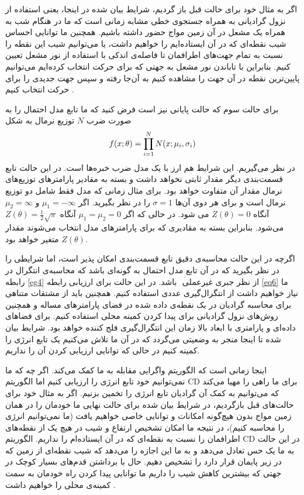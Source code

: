 اگر به مثال خود برای حالت قبل باز گردیم، شرایط بیان شده در اینجا، یعنی‌ استفاده از نزول گرادیانی به همراه جستجوی خطی‌ مشابه زمانی‌ است که ما در هنگام شب به همراه یک مشعل در آن زمین مواج حضور داشته باشیم. همچنین ما توانایی احساس شیب نقطه‌ای که در آن ایستاده‌ایم را خواهیم داشت، یا می‌‌توانیم شیب این نقطه را نسبت به تمام جهت‌های اطرافمان تا فاصله‌ی اندکی‌ با استفاده از نور مشعل تعیین کنیم. بنابراین با تاباندن نور مشعل به جهتی‌ که برای حرکت انتخاب کرده‌ایم می‌‌توانیم پایین‌ترین نقطه در آن جهت را مشاهده کنیم به آن‌جا رفته و سپس جهت جدیدی را برای حرکت انتخاب کنیم
 \cite{woodfordnotes}.

 
 
 برای حالت سوم که حالت پایانی نیز است فرض کنید که ما تابع مدل احتمال را به صورت ضرب
 $N$
 توزیع نرمال به شکل
 \begin{align}
 	\centering
 	f(x;\theta)=\prod_{i=1}^N N(x;\mu_i,\sigma_i)
 	\label{eq8}
 \end{align}
 در نظر می‌‌گیریم.
این شرایط هم ارز با یک مدل ضرب خبره‌ها است. در این حالت تابع قسمت‌بندی دیگر مقدار ثابتی نخواهد داشت و بسته به مقادیر پارامتر‌های توزیع‌های نرمال مقدار آن متفاوت خواهد بود. برای مثال زمانی‌ که مدل فقط شامل دو توزیع نرمال است و برای هر دوی آن‌ها
 $\sigma = 1$
 را در نظر بگیرید. اگر
 $\mu_1 = -\infty$
 و
 $\mu_2 = \infty$
 آنگاه
 $Z(\theta) = 0$
 می‌ شود. در حالی‌ که اگر
 $\mu_1 = \mu_2 = 0$
 آنگاه
 $Z(\theta) = \frac{1}{2}\sqrt{\pi}$
 می‌شود. بنابراین بسته به مقادیری که برای پارامتر‌های مدل انتخاب می‌‌شوند مقدار
 $Z(\theta)$
 متغیر خواهد بود.
 
 اگرچه در این حالت محاسبه‌‌ی دقیق تابع قسمت‌بندی امکان پذیر است، اما شرایطی را در نظر بگیرید که در آن تابع مدل احتمال به گونه‌ای باشد که محاسبه‌ی‌ انتگرال در رابطه
\ref{eg4}
 از نظر جبری غیرعملی
 ‌ باشد. در این حالت برای ارزیابی رابطه
\ref{eq6}
 ما نیاز خواهیم داشت از انتگرال‌گیری عددی
 استفاده کنیم. همچنین باید از مشتقات متناهی برای محاسبه گرادیان در یک نقطه‌ی داده شده در فضای پارامتر‌های مساله و همچنین روش‌های نزول گرادیانی برای پیدا کردن کمینه محلی استفاده کنیم. برای فضاهای داده‌ای و پارامتری با ابعاد بالا زمان این انتگرال‌گیری فلج کننده
 خواهد بود. شرایط بیان شده تا اینجا منجر به وضعیتی می‌‌گردد که در آن ما تلاش می‌‌کنیم یک تابع انرژی را کمینه کنیم در حالی‌ که توانایی ارزیابی کردن آن را نداریم.
 
 اینجا زمانی‌ است که الگوریتم واگرایی مقابله به ما کمک می‌‌کند. اگر چه که ما نمی‌‌توانیم خود تابع انرژی را ارزیابی کنیم اما الگوریتم
 CD
 برای ما راهی‌ را مهیا می‌‌کند که می‌توانیم به کمک آن گرادیان تابع انرژی را تخمین بزنیم. اگر به مثال خود برای حالت‌های قبل بازگردیم، در شرایط بیان شده برای حالت نهایی ما خودمان را در همان زمین مواج بدون هیچ‌گونه امکانات و توانایی خاصی خواهیم یافت (ما نمی‌‌توانیم انرژی را محاسبه کنیم)، در نتیجه ما امکان تشخیص ارتفاع و شیب در هیچ یک از نقطه‌های اطرافمان را نسبت به نقطه‌ای که در آن ایستاده‌ام را نداریم. الگوریتم
 CD
 در این حالت به ما یک حس تعادل می‌‌دهد و به ما این اجازه را می‌‌دهد که شیب نقطه‌ای از زمین که در زیر پایمان قرار دارد را تشخیص دهیم. حال با برداشتن قدم‌های بسیار کوچک در جهتی‌ که بیشترین کاهش شیب را داریم ما توانایی پیدا کردن راه خودمان به سمت کمینه‌ی محلی را خواهیم داشت
 \cite{woodfordnotes}.
 
